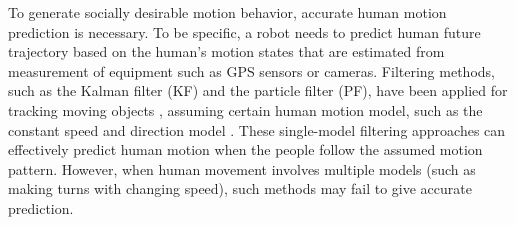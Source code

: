 \documentclass[letterpaper, 10 pt, conference]{ieeeconf}
\newcommand{\todonote}[1]{\vspace{0px} %
	\todo[inline, color=green!30]{\textbf{[Note:]} {#1}} %
}
\newcommand{\todohere}[1]{\hl{(\textbf{TODO:} #1)}}
\begin{document}
	To generate socially desirable motion behavior, accurate human motion prediction is necessary.
	To be specific, a robot needs to predict human future trajectory based on the human's motion states that are estimated from measurement of equipment such as GPS sensors or cameras.
	Filtering methods, such as the Kalman filter (KF) and the particle filter (PF), have been applied for tracking moving objects \cite {koller1994robust,}, assuming certain human motion model, such as the constant speed and direction model \cite{svenstrup2010trajectory,bruce2004better}.
	These single-model filtering approaches can effectively predict human motion when the people follow the assumed motion pattern.
	However, when human movement involves multiple models (such as making turns with changing speed), such methods may fail to give accurate prediction.
	
	
\end{document}
